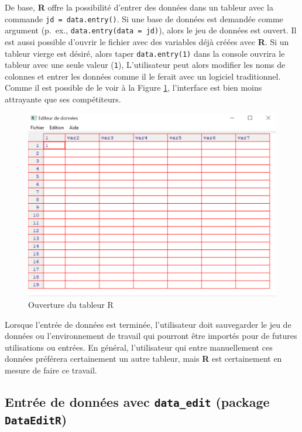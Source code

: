 \documentclass[
]{book}
\begin{document}
De base, \textbf{R} offre la possibilité d'entrer des données dans un tableur avec la commande \texttt{jd\ =\ data.entry()}. Si une base de données est demandée comme argument (p.~ex., \texttt{data.entry(data\ =\ jd)}), alors le jeu de données est ouvert. Il est aussi possible d'ouvrir le fichier avec des variables déjà créées avec \textbf{R}. Si un tableur vierge est désiré, alors taper \texttt{data.entry(1)} dans la console ouvrira le tableur avec une seule valeur (\texttt{1}), L'utilisateur peut alors modifier les noms de colonnes et entrer les données comme il le ferait avec un logiciel traditionnel. Comme il est possible de le voir à la Figure \ref{fig:dataentry}, l'interface est bien moins attrayante que ses compétiteurs.

\begin{figure}

{\centering \includegraphics[width=0.75\linewidth]{image//data_entry} 

}

\caption{Ouverture du tableur R}\label{fig:dataentry}
\end{figure}

Lorsque l'entrée de données est terminée, l'utilisateur doit sauvegarder le jeu de données ou l'environnement de travail qui pourront être importés pour de futures utilisations ou entrées. En général, l'utilisateur qui entre manuellement ces données préférera certainement un autre tableur, mais \textbf{R} est certainement en mesure de faire ce travail.

\hypertarget{entruxe9e-de-donnuxe9es-avec-data_edit-package-dataeditr}{%
\subsection{\texorpdfstring{Entrée de données avec \texttt{data\_edit} (package \texttt{DataEditR})}{Entrée de données avec data\_edit (package DataEditR)}}\label{entruxe9e-de-donnuxe9es-avec-data_edit-package-dataeditr}}
\end{document}
